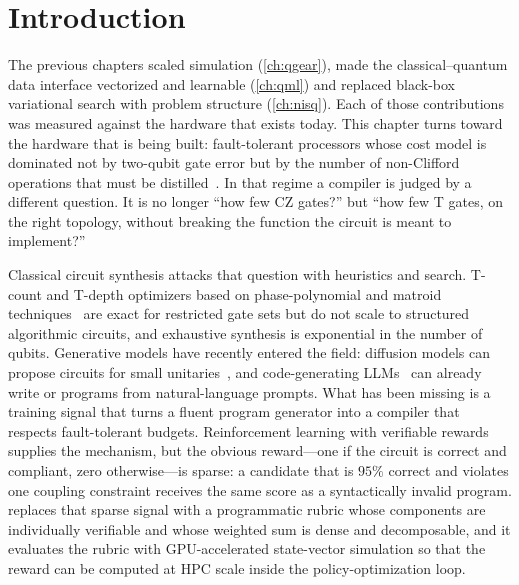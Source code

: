 \section{Introduction}\label{sec:syn:intro}

The previous chapters scaled simulation (\cref{ch:qgear}), made the classical--quantum data interface vectorized and learnable (\cref{ch:qml}) and replaced black-box variational search with problem structure (\cref{ch:nisq}). Each of those contributions was measured against the hardware that exists today. This chapter turns toward the hardware that is being built: fault-tolerant processors whose cost model is dominated not by two-qubit gate error but by the number of non-Clifford operations that must be distilled~\cite{bravyi2005magic,fowler2012surfacecodes}. In that regime a compiler is judged by a different question. It is no longer ``how few CZ gates?'' but ``how few T gates, on the right topology, without breaking the function the circuit is meant to implement?''

Classical circuit synthesis attacks that question with heuristics and search. T-count and T-depth optimizers based on phase-polynomial and matroid techniques~\cite{amy2014tpar} are exact for restricted gate sets but do not scale to structured algorithmic circuits, and exhaustive synthesis is exponential in the number of qubits. Generative models have recently entered the field: diffusion models can propose circuits for small unitaries~\cite{furrutter2024genqc}, and code-generating LLMs~\cite{chen2021codex} can already write \qiskit{} or \cudaq{} programs from natural-language prompts. What has been missing is a training signal that turns a fluent program generator into a compiler that respects fault-tolerant budgets. Reinforcement learning with verifiable rewards~\cite{deepseek2025r1} supplies the mechanism, but the obvious reward---one if the circuit is correct and compliant, zero otherwise---is sparse: a candidate that is $95\%$ correct and violates one coupling constraint receives the same score as a syntactically invalid program. \rubriq{} replaces that sparse signal with a programmatic rubric whose components are individually verifiable and whose weighted sum is dense and decomposable, and it evaluates the rubric with GPU-accelerated state-vector simulation so that the reward can be computed at HPC scale inside the policy-optimization loop.

